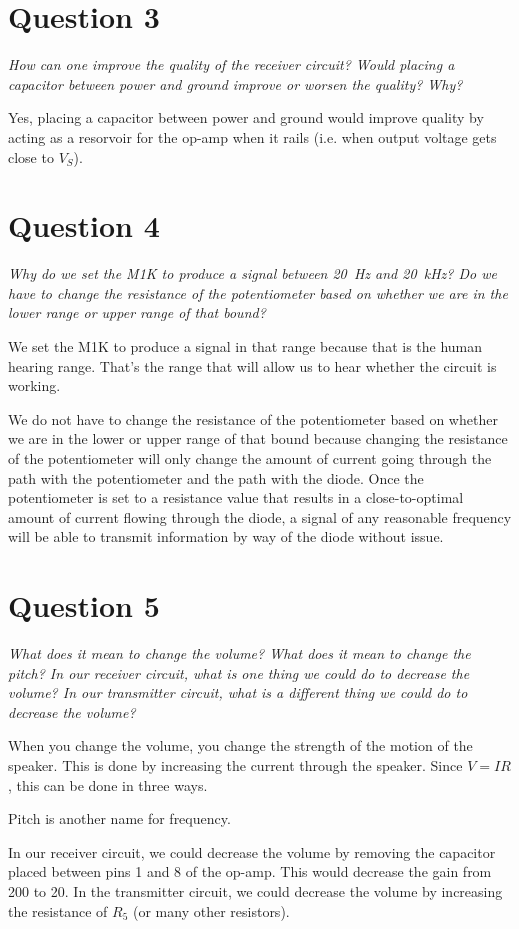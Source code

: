 \documentclass[12pt]{../manual}
\begin{document}
\section{Question 3}
\textit{How can one improve the quality of the receiver circuit? Would placing a capacitor between power and ground improve or worsen the quality? Why?}

Yes, placing a capacitor between power and ground would improve quality by acting as a resorvoir for the op-amp when it rails (i.e. when output voltage gets close to $V_S$).

\newpage
\section{Question 4}
\textit{Why do we set the M1K to produce a signal between \SI{20}{\hertz} and \SI{20}{\kilo\hertz}? Do we have to change the resistance of the potentiometer based on whether we are in the lower range or upper range of that bound?}

We set the M1K to produce a signal in that range because that is the human hearing range. That's the range that will allow us to hear whether the circuit is working.

We do not have to change the resistance of the potentiometer based on whether we are in the lower or upper range of that bound because changing the resistance of the potentiometer will only change the amount of current going through the path with the potentiometer and the path with the diode. Once the potentiometer is set to a resistance value that results in a close-to-optimal amount of current flowing through the diode, a signal of any reasonable frequency will be able to transmit information by way of the diode without issue.
\section{Question 5}
\textit{What does it mean to change the volume? What does it mean to change the pitch? In our receiver circuit, what is one thing we could do to decrease the volume? In our transmitter circuit, what is a different thing we could do to decrease the volume?}

When you change the volume, you change the strength of the motion of the speaker. This is done by increasing the current through the speaker. Since $V=IR$, this can be done in three ways. 

Pitch is another name for frequency.

In our receiver circuit, we could decrease the volume by removing the capacitor placed between pins 1 and 8 of the op-amp. This would decrease the gain from 200 to 20. In the transmitter circuit, we could decrease the volume by increasing the resistance of $R_5$ (or many other resistors).
\end{document}
